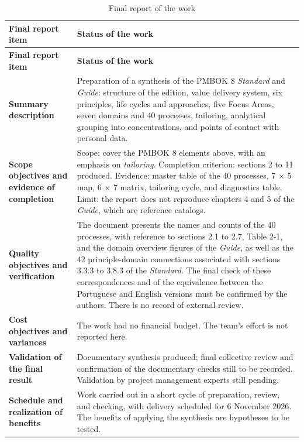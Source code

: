 \documentclass[12pt,a4paper,article,oneside,brazil,english]{abntex2}
\begin{document}
\begingroup\SingleSpacing\small
\begin{longtable}{@{}>{\raggedright\arraybackslash}p{}>{\raggedright\arraybackslash}p{}@{}}
\caption{Final report of the work}\label{tab:t14}\\
\hline
\textbf{Final report item} & \textbf{Status of the work}\\
\hline
\endfirsthead
\hline
\textbf{Final report item} & \textbf{Status of the work}\\
\hline
\endhead
\hline
\endfoot
\hline
\endlastfoot
\textbf{Summary description} & Preparation of a synthesis of the PMBOK 8 \textit{Standard} and \textit{Guide}: structure of the edition, value delivery system, six principles, life cycles and approaches, five Focus Areas, seven domains and 40 processes, tailoring, analytical grouping into concentrations, and points of contact with personal data.\\[3pt]
\textbf{Scope objectives and evidence of completion} & Scope: cover the PMBOK 8 elements above, with an emphasis on \textit{tailoring}. Completion criterion: sections 2 to 11 produced. Evidence: master table of the 40 processes, 7 \ensuremath{\times} 5 map, 6 \ensuremath{\times} 7 matrix, tailoring cycle, and diagnostics table. Limit: the report does not reproduce chapters 4 and 5 of the \textit{Guide}, which are reference catalogs.\\[3pt]
\textbf{Quality objectives and verification} & The document presents the names and counts of the 40 processes, with reference to sections 2.1 to 2.7, Table 2-1, and the domain overview figures of the \textit{Guide}, as well as the 42 principle-domain connections associated with sections 3.3.3 to 3.8.3 of the \textit{Standard}. The final check of these correspondences and of the equivalence between the Portuguese and English versions must be confirmed by the authors. There is no record of external review.\\[3pt]
\textbf{Cost objectives and variances} & The work had no financial budget. The team's effort is not reported here.\\[3pt]
\textbf{Validation of the final result} & Documentary synthesis produced; final collective review and confirmation of the documentary checks still to be recorded. Validation by project management experts still pending.\\[3pt]
\textbf{Schedule and realization of benefits} & Work carried out in a short cycle of preparation, review, and checking, with delivery scheduled for 6 November 2026. The benefits of applying the synthesis are hypotheses to be tested.\\[3pt]

\end{longtable}
\end{document}
